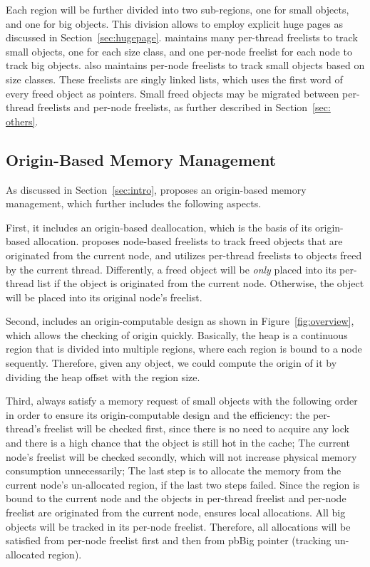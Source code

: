 Each region will be further divided into two sub-regions, one for small objects, and one for big objects. This division allows \NM{} to employ explicit huge pages as discussed in Section~\ref{sec:hugepage}. \NM{} maintains many per-thread freelists to track small objects, one for each size class, and one per-node freelist for each node to track big objects. \NM{} also maintains per-node freelists to track small objects based on size classes. These freelists are singly linked lists, which uses the first word of every freed object as pointers.  Small freed objects may be migrated between per-thread freelists and per-node freelists, as further described in Section~\ref{sec: others}. 

\subsection{Origin-Based Memory Management} 
\label{sec:taskassign}

As discussed in Section~\ref{sec:intro}, \NM{} proposes an origin-based memory management, which further includes the following aspects. 

First, it includes an origin-based deallocation, which is the basis of its origin-based allocation. \NM{} proposes node-based freelists to track freed objects that are originated from the current node, and utilizes per-thread freelists to objects freed by the current thread. Differently, a freed object will be \textit{only} placed into its per-thread list if the object is originated from the current node. Otherwise, the object will be placed into its original node's freelist.  

Second, \NM{} includes an origin-computable design as shown in Figure~\ref{fig:overview}, which allows the checking of origin quickly. Basically, the heap is a continuous region that is divided into multiple regions, where each region is bound to a node sequently. Therefore, given any object, we could compute the origin of it by dividing the heap offset with the region size. 

Third, \NM{} always satisfy a memory request of small objects with the following order in order to ensure its origin-computable design and the efficiency: the per-thread's freelist will be checked first, since there is no need to acquire any lock and there is a high chance that the object is still hot in the cache; The current node's freelist will be checked secondly, which will not increase physical memory consumption unnecessarily; The last step is to allocate the memory from the current node's un-allocated region, if the last two steps failed. Since the region is bound to the current node and the objects in per-thread freelist and per-node freelist are originated from the current node, \NM{} ensures local allocations. All big objects will be tracked in its per-node freelist. Therefore, all allocations will be satisfied from per-node freelist first and then from pbBig pointer (tracking un-allocated region). 

